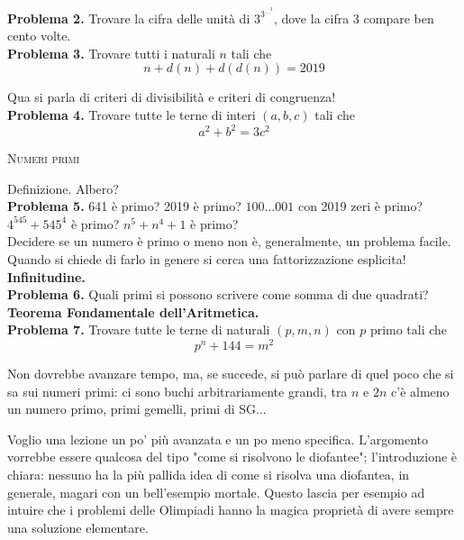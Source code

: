 \documentclass[a4paper]{article}
\theoremstyle{remark}
\theoremstyle{definition}
\begin{document}
\begin{multicols}{2}
\begin{enumerate}
	\end{enumerate}
	
	\textbf{Problema 2.} Trovare la cifra delle unità di $ 3^{3^{\dots^3}} $, dove la cifra $ 3 $ compare ben cento volte. \\
	
	\textbf{Problema 3.} Trovare tutti i naturali $ n $ tali che \[ n + d(n) + d(d(n)) = 2019 \]
	
	\textsf{Qua si parla di criteri di divisibilità e criteri di congruenza!}\\
	
	\textbf{Problema 4.} Trovare tutte le terne di interi $ (a, b, c) $ tali che $$  a^2 + b^2 = 3c^2  $$
	
	\begin{center}
		\textsc{Numeri primi}
	\end{center}
	\textsf{Definizione. Albero?}\\
	
	\textbf{Problema 5.} 641 è primo? 2019 è primo? $ 1{00\dots 00}1 $ con 2019 zeri è primo? $ 4^{545} + 545^4 $ è primo? $ n^5 + n^4 +1 $ è primo? \\
	
	\textsf{Decidere se un numero è primo o meno non è, generalmente, un problema facile. Quando si chiede di farlo in genere si cerca una fattorizzazione esplicita!}\\
	
	\textbf{Infinitudine.} \\
	
	\textbf{Problema 6.} Quali primi si possono scrivere come somma di due quadrati? \\

	\textbf{Teorema Fondamentale dell'Aritmetica.} \\
	
	\textbf{Problema 7.} Trovare tutte le terne di naturali $ (p, m, n) $ con $ p $ primo tali che
	\[ p^n +144 = m^2 \]
	
	
	\textsf{Non dovrebbe avanzare tempo, ma, se succede, si può parlare di quel poco che si sa sui numeri primi: ci sono buchi arbitrariamente grandi, tra $ n $ e $ 2n $ c'è almeno un numero primo, primi gemelli, primi di SG...}
	
	
	
\end{multicols}

\newpage

\begin{multicols}{2}
	\textsf{Voglio una lezione un po' più avanzata e un po meno specifica. L'argomento vorrebbe essere qualcosa del tipo "come si risolvono le diofantee"; l'introduzione è chiara: nessuno ha la più pallida idea di come si risolva una diofantea, in generale, magari con un bell'esempio mortale. Questo lascia per esempio ad intuire che i problemi delle Olimpiadi hanno la magica proprietà di avere sempre una soluzione elementare.}
\end{multicols}
\end{document}
